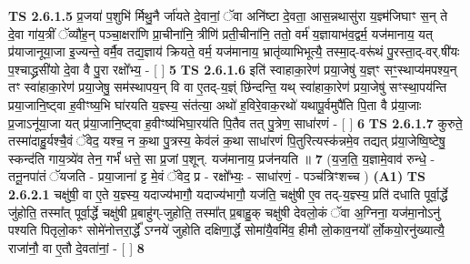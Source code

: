\documentclass[17pt]{extarticle}
\begin{document}
                                \textbf{ TS 2.6.1.5} \newline
                  प्र॒जया॑ प॒शुभि॑ र्मिथु॒नै र्जा॑यते दे॒वानां॒ ॅवा अनि॑ष्टा दे॒वता॒ आस॒न्नथासु॑रा य॒ज्ञ्म॑जिघाꣳ स॒न् ते दे॒वा गा॑य॒त्रीं ॅव्यौ॑ह॒न् पञ्चा॒क्षरा॑णि प्रा॒चीना॑नि॒ त्रीणि॑ प्रती॒चीना॑नि॒ ततो॒ वर्म॑ य॒ज्ञायाभ॑व॒द्वर्म॒ यज॑मानाय॒ यत् प्र॑याजानूया॒जा इ॒ज्यन्ते॒ वर्मै॒व तद्य॒ज्ञाय॑ क्रियते॒ वर्म॒ यज॑मानाय॒ भ्रातृ॑व्याभिभूत्यै॒ तस्मा॒द्-वरू॑थं पु॒रस्ता॒द्-वर्.षी॑यः प॒श्चाद्ध्रसी॑यो दे॒वा वै पु॒रा रक्षो᳚भ्य॒ - [  ] \textbf{  5} \newline
                  \newline
                                \textbf{ TS 2.6.1.6} \newline
                  इति॑ स्वाहाका॒रेण॑ प्रया॒जेषु॑ य॒ज्ञ्ꣳ सꣳ॒॒स्थाप्य॑मपश्य॒न् तꣳ स्वा॑हाका॒रेण॑ प्रया॒जेषु॒ सम॑स्थापय॒न् वि वा ए॒तद्-य॒ज्ञ्ं छि॑न्दन्ति॒ यथ् स्वा॑हाका॒रेण॑ प्रया॒जेषु॑ सꣳस्था॒पय॑न्ति प्रया॒जानि॒ष्ट्वा ह॒वीꣳष्य॒भि घा॑रयति य॒ज्ञ्स्य॒ संत॑त्या॒ अथो॑ ह॒विरे॒वाक॒रथो॑ यथापू॒र्वमुपै॑ति पि॒ता वै प्र॑या॒जाः प्र॒जाऽनू॑या॒जा यत् प्र॑या॒जानि॒ष्ट्वा ह॒वीꣳष्य॑भिघा॒रय॑ति पि॒तैव तत् पु॒त्रेण॒ साधा॑रणं - [  ] \textbf{  6} \newline
                  \newline
                                \textbf{ TS 2.6.1.7} \newline
                  कुरुते॒ तस्मा॑दाहु॒र्यश्चै॒वं ॅवेद॒ यश्च॒ न क॒था पु॒त्रस्य॒ केव॑लं क॒था साधा॑रणं पि॒तुरित्यस्क॑न्नमे॒व तद्यत् प्र॑या॒जेष्वि॒ष्टेषु॒ स्कन्द॑ति गाय॒त्र्ये॑व तेन॒ गर्भं॑ धत्ते॒ सा प्र॒जां प॒शून्. यज॑मानाय॒ प्रज॑नयति ॥ \textbf{  7} \newline
                  \newline
                      (य॒ज॒ति॒ य॒ज्ञामे॒वाव॑ रुन्धे॒ - तनू॒नपा॑तं ॅयजति - प्रया॒जाना॑ ट्ट मे॒वं ॅवेद॒ प्र - रक्षो᳚भ्यः॒ - साधा॑रणं॒ - पञ्च॑त्रिꣳशच्च )  \textbf{(A1)} \newline \newline
                                        \textbf{ TS 2.6.2.1} \newline
                  चक्षु॑षी॒ वा ए॒ते य॒ज्ञ्स्य॒ यदाज्य॑भागौ॒ यदाज्य॑भागौ॒ यज॑ति॒ चक्षु॑षी ए॒व तद्-य॒ज्ञ्स्य॒ प्रति॑ दधाति पूर्वा॒र्द्धे जु॑होति॒ तस्मा᳚त् पूर्वा॒र्द्धे चक्षु॑षी प्र॒बाहु॑ग्-जुहोति॒ तस्मा᳚त् प्र॒बाहु॒क् चक्षु॑षी देवलो॒कं ॅवा अ॒ग्निना॒ यज॑मा॒नोऽनु॑ पश्यति पितृलो॒कꣳ सोमे॑नोत्तरा॒र्द्धे᳚ ऽग्नये॑ जुहोति दक्षिणा॒र्द्धे सोमा॑यै॒वमि॑व॒ हीमौ लो॒काव॒नयो᳚ र्लो॒कयो॒रनु॑ख्यात्यै॒ राजा॑नौ॒ वा ए॒तौ दे॒वता॑नां॒ - [  ] \textbf{  8} \newline
\end{document}
